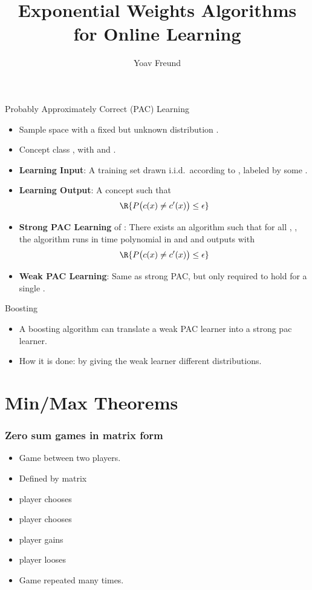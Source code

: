 \documentclass[handout]{beamer}
\title[\ouralg] %
{Exponential Weights Algorithms for Online Learning}
\author[Freund] %
{Yoav Freund}
\date{}
\institute[Universities of Somewhere and Elsewhere] %
\begin{document}
\begin{frame}
  \titlepage
  \begin{small}
  \end{small}
\end{frame}


\begin{frame}{Probably Approximately Correct (PAC) Learning}
  \begin{itemize}
    \item Sample space  with a fixed but unknown distribution .
    \item Concept class , with  and .
    \item \textbf{Learning Input}: A training set  
          drawn i.i.d.\ according to , labeled by some .
    \item \textbf{Learning Output}: A concept  such that 
      \[
         \R{P\bigl(c(x) \neq c'(x)\bigr) \leq \epsilon}
      \]
    \item \textbf{Strong PAC Learning} of : There exists an algorithm such that 
      for all \R{$\epsilon$}, \R{$\delta$}, the algorithm runs in time polynomial 
      in  and  and outputs  with
      \[
        \R{P\bigl(c(x) \neq c'(x)\bigr) \leq \epsilon}
      \]
    \item \textbf{Weak PAC Learning}: Same as strong PAC, 
      but only required to hold for a single .
  \end{itemize}
\end{frame}

\begin{frame}{Boosting}
  \begin{itemize}
  \item A boosting algorithm can translate a weak PAC learner into a strong pac learner.
  \item How it is done: by giving the weak learner different distributions.
  \end{itemize}
  \end{frame}

\section{Min/Max Theorems}

\begin{frame}
\frametitle{Zero sum games in matrix form}
\begin{itemize}
\item Game between two players.
\item Defined by  matrix \R{$\M$}
\item {} player chooses 
\item {} player chooses 
\item {} player gains 
\item {} player looses 
\item Game repeated many times.
\end{itemize}
\end{frame}
\end{document}
